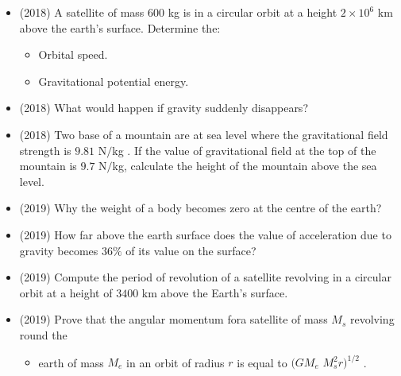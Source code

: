 \documentclass{article}
\begin{document}
\begin{itemize}
\begin{itemize}
\end{itemize}
\item (2018)  A satellite of mass $ 600$ kg is in a circular orbit at a height $ 2 \times 10^{6}$ km above the earth’s surface. Determine the:\begin{itemize}
\item Orbital speed. 
\item Gravitational potential energy. 
\end{itemize}
\item (2018)  What would happen if gravity suddenly disappears?  
\item (2018)  Two base of a mountain are at sea level where the gravitational field strength is $ 9.81$ N$/$kg . If the value of gravitational field at the top of the mountain is $ 9.7$ N$/$kg, calculate the height of the mountain above the sea level. 
\item (2019)  Why the weight of a body becomes zero at the centre of the earth? 
\item (2019)  How far above the earth surface does the value of acceleration due to gravity becomes $ 36\%$ of its value on the surface? 
\item (2019)  Compute the period of revolution of a satellite revolving in a circular orbit at a height of $ 3400$ km above the Earth’s surface. 
\item (2019)  Prove that the angular momentum fora satellite of mass $ M_{s}$ revolving round the\begin{itemize}
\item earth of mass $ M_{e}$ in an orbit of radius $ r$ is equal to $ (G M_{e}$  $ M_{s}^{2}r)^{1/2}$ .
\end{itemize}
\end{itemize}
\end{document}
